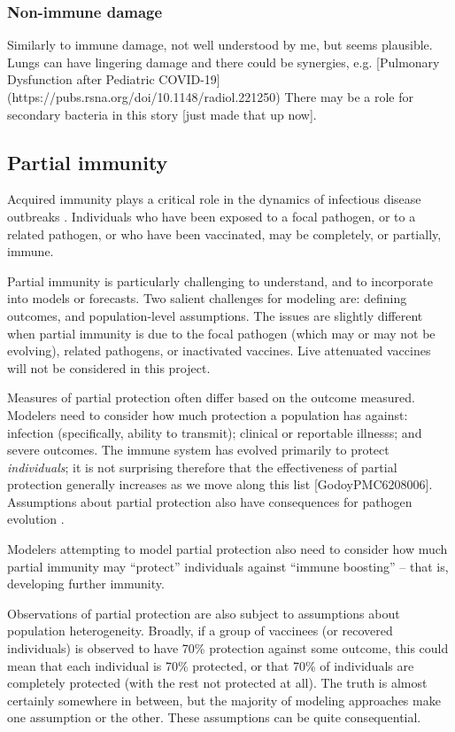 \documentclass[12pt]{article}
\newcommand{\head}{\subsection*}
\newcommand{\sub}{\subsubsection*}
\begin{document}
\sub{Non-immune damage}

Similarly to immune damage, not well understood by me, but seems plausible. Lungs can have lingering damage and there could be synergies, e.g. [Pulmonary Dysfunction after Pediatric COVID-19](https://pubs.rsna.org/doi/10.1148/radiol.221250) There may be a role for secondary bacteria in this story [just made that up now]. 

\head{Partial immunity}

\bigskip\noindent Acquired immunity plays a critical role in the dynamics of infectious disease outbreaks \cite{anderson1985vaccination}. Individuals who have been exposed to a focal pathogen, or to a related pathogen, or who have been vaccinated, may be completely, or partially, immune.

Partial immunity is particularly challenging to understand, and to incorporate into models or forecasts. Two salient challenges for modeling are: defining outcomes, and population-level assumptions. The issues are slightly different when partial immunity is due to the focal pathogen (which may or may not be evolving), related pathogens, or inactivated vaccines. Live attenuated vaccines will not be considered in this project.

Measures of partial protection often differ based on the outcome measured. Modelers need to consider how much protection a population has against: infection (specifically, ability to transmit); clinical or reportable illnesss; and severe outcomes. The immune system has evolved primarily to protect \emph{individuals}; it is not surprising therefore that the effectiveness of partial protection generally increases as we move along this list [GodoyPMC6208006]. Assumptions about partial protection also have consequences for pathogen evolution \cite{gandon2003imperfect}.

Modelers attempting to model partial protection also need to consider how much partial immunity may “protect” individuals against “immune boosting” -- that is, developing further immunity.

Observations of partial protection are also subject to assumptions about population heterogeneity. Broadly, if a group of vaccinees (or recovered individuals) is observed to have 70\% protection against some outcome, this could mean that each individual is 70\% protected, or that 70\% of individuals are completely protected (with the rest not protected at all). The truth is almost certainly somewhere in between, but the majority of modeling approaches make one assumption or the other. These assumptions can be quite consequential.
\end{document}
